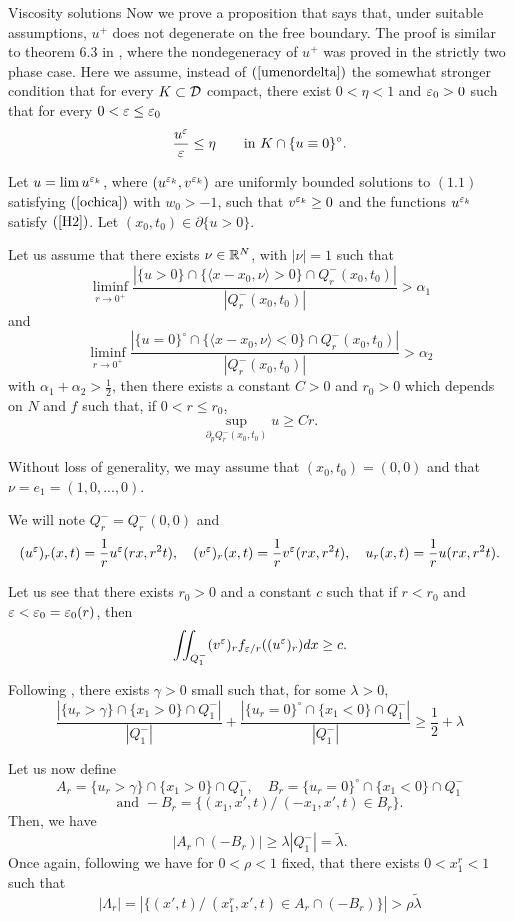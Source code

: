 \begin{section}{Viscosity solutions}
Now we prove a 
proposition that says that, under suitable assumptions, $u^+$ does 
not degenerate on the free boundary. The proof is similar to theorem 6.3 in 
\cite{CLW1}, where the nondegeneracy of $u^+$ was proved in the strictly two 
phase case. Here we assume, instead of $(\ref{umenordelta})$ the somewhat
stronger condition that for every $K\subset{\cal D}$ compact, there exist $0<
\eta<1$
and $\varepsilon_0>0$ such that for every $0<\varepsilon\le\varepsilon_0$
\begin{equation}\label{H2}
\frac{u^\varepsilon}{\varepsilon}\le \eta\qquad\mbox{in }K\cap{\{u\equiv0\}^\circ}.
\end{equation}


\begin{prop} 
\label{degeneracy}
Let $u=\lim u^{\varepsilon_k}$, where $(u^{\varepsilon_k},v^{\varepsilon_k})$ are uniformly bounded
solutions to $(1.1)$ satisfying $(\ref{ochica})$ with $w_0>-1$, such that
$v^{\varepsilon_k}\ge0$
and the functions $u^{\varepsilon_k}$ satisfy $(\ref{H2})$.
Let $(x_0,t_0)\in\partial\{ u>0 \}$. 
 
Let us assume that there exists $\nu\in {\Bbb R}^N$, with $|\nu|=1$ such that
$$\liminf_{r\to 0^+}\frac{|\{u>0\}\cap\{\langle x-x_0,\nu\rangle>0\}\cap
Q^-_r(x_0,t_0)|}{|Q^-_r(x_0,t_0)|}>\alpha_1$$
and
$$\liminf_{r\to 0^+}\frac{|\{ u=0 \}^\circ\cap\{\langle x-x_0,\nu\rangle<0\}\cap
Q^-_r(x_0,t_0)|}{|Q^-_r(x_0,t_0)|}>\alpha_2$$
with $\alpha_1+\alpha_2>\frac12$, then there exists a constant $C>0$ and 
$r_0>0$ which depends on $N$ and $f$ such that, if $0<r\le r_0$, 
$$\sup_{\partial_p Q_r^-(x_0,t_0)} u\ge C r.$$
\end{prop}

\begin{pf}
Without loss of generality, we may assume that $(x_0,t_0)=(0,0)$ and that  
$\nu=e_1=(1,0,...,0)$. 

We will note $Q_r^-=Q_r^-(0,0)$ and
$$
(u^\varepsilon)_r(x,t)=\frac{1}{r}u^\varepsilon(rx,r^2t),\quad (v^\varepsilon)_r(x,t)=\frac{1}{r}
v^\varepsilon(rx,r^2t),\quad
u_r(x,t)=\frac{1}{r}u(rx,r^2t).$$

Let us see that there exists $r_0>0$ and a constant $c$ such that if
$r<r_0$ and $\varepsilon<\varepsilon_0=\varepsilon_0(r)$, then
$$\iint_{Q_1^-}(v^\varepsilon)_r f_{\varepsilon/r}((u^\varepsilon)_r) dx\ge c.$$


Following \cite{CLW1}, there exists $\gamma>0$ small such that, for some 
$\lambda>0$, 
$$\frac{|\{u_r>\gamma\}\cap\{ x_1>0 \}\cap Q^-_1|}{|Q^-_1|} + 
\frac{|\{ u_r=0 \}^\circ\cap\{ x_1<0 \}\cap Q^-_1|}{|Q^-_1|}\ge \frac12 + \lambda$$

Let us now define
$$A_r=\{ u_r>\gamma \}\cap\{ x_1>0 \}\cap Q_1^-,\quad
B_r=\{ u_r=0 \}^\circ\cap\{ x_1<0 \}\cap Q_1^-$$
$$\mbox{and } -B_r=\{(x_1,x',t)/\ (-x_1,x',t)\in B_r\}.$$
Then, we have
$$|A_r\cap (-B_r)|\ge \lambda |Q_1^-| = \tilde{\lambda}.$$
Once again, following \cite{CLW1} we have for $0<\rho<1$ fixed, that there  
exists $0<x_1^r<1$ such that
$$|\Lambda_r|=|\{ (x',t)/\ (x_1^r,x',t)\in A_r\cap (-B_r)\}|>
\rho\tilde{\lambda}$$


\end{pf}
\end{section}

